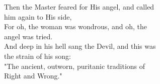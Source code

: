 \begin{poemblock}
Then the Master feared for His angel, and called\\
\idt him again to His side,\\
For oh, the woman was wondrous, and oh, the\\
\idt angel was tried.\\
And deep in his hell sang the Devil, and this was\\
\idt the strain of his song:\\
"The ancient, outworn, puritanic traditions of\\
\idt Right and Wrong."

\end{poemblock}
